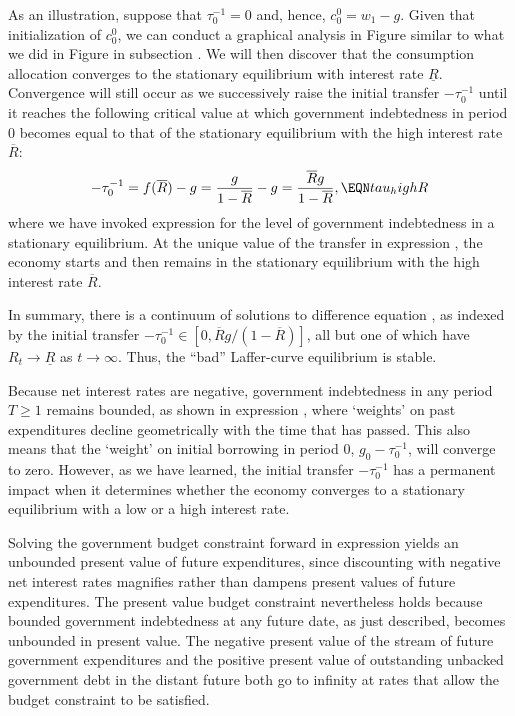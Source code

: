 As an illustration, suppose that $\tau^{-1}_0=0$ and,
hence, $c^0_0 = w_1 -g$. Given that initialization 
of $c^0_0$, we can conduct a graphical analysis
in Figure  similar to what we did
in Figure  
in subsection . We will then
discover that the consumption allocation converges 
to the stationary equilibrium with interest rate 
$\underline R$. Convergence will still occur as we
successively raise the initial transfer $- \tau^{-1}_0$
until it reaches the following critical value at which 
government indebtedness in period $0$ becomes equal 
to that of the stationary equilibrium with the high 
interest rate $\overline R$:
$$ - \tau^{-1}_0 =  f(\overline R) - g 
           =  {g \over 1-\overline R} -g
           = {\overline R g \over 1- \overline R},    \EQN tau_highR
$$
where we have invoked expression 
for the level of government indebtedness in
a stationary equilibrium. At the unique value of the
transfer in expression , the economy
starts and then remains in the stationary
equilibrium with the high interest rate $\overline R$. 


In summary, there is a continuum of solutions
to  difference equation , as indexed by the
initial transfer 
$- \tau^{-1}_0 \in [0, \overline R g /(1- \overline R)]$, 
all but one of which  have
$R_t \rightarrow \underline R$ as $t \rightarrow \infty$.  
Thus, the ``bad'' Laffer-curve equilibrium is stable.

Because net interest rates are negative, government indebtedness
in any period $T\geq 1$ remains bounded, as shown in expression , 
where `weights' on past expenditures decline 
geometrically with the time that has passed. This also means 
that the `weight' on initial borrowing in period $0$, 
$g_0-\tau^{-1}_0$, will converge to zero. However,
as we have learned, the initial 
transfer $-\tau^{-1}_0$ has a permanent impact when it determines whether
the economy converges to a stationary
equilibrium with a low or a high interest rate.

Solving the government budget constraint
forward in expression  yields an
unbounded present value of future expenditures,
since discounting with negative net interest rates magnifies
rather than dampens present values of future expenditures.
The present value budget constraint nevertheless holds because
bounded government indebtedness at any future
date, as just described, becomes unbounded in
present value. The negative present value
of the stream of future government expenditures
and the positive present value of outstanding unbacked 
government debt in the distant future both go to infinity 
at rates that allow the budget constraint to be satisfied.



